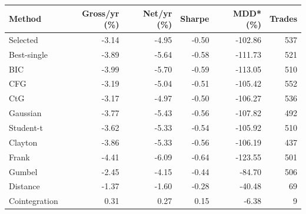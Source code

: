 \begin{tabular}{@{}lrrrrr@{}}
\toprule
Method & Gross/yr (\%) & Net/yr (\%) & Sharpe & MDD* (\%) & Trades \\
\midrule
Selected & -3.14 & -4.95 & -0.50 & -102.86 & 537 \\
Best-single & -3.89 & -5.64 & -0.58 & -111.73 & 521 \\
BIC & -3.99 & -5.70 & -0.59 & -113.05 & 510 \\
CFG & -3.19 & -5.04 & -0.51 & -105.42 & 552 \\
CtG & -3.17 & -4.97 & -0.50 & -106.27 & 536 \\
Gaussian & -3.77 & -5.43 & -0.56 & -107.82 & 492 \\
Student-t & -3.62 & -5.33 & -0.54 & -105.92 & 510 \\
Clayton & -3.86 & -5.33 & -0.56 & -106.19 & 437 \\
Frank & -4.41 & -6.09 & -0.64 & -123.55 & 501 \\
Gumbel & -2.45 & -4.15 & -0.44 & -84.70 & 506 \\
Distance & -1.37 & -1.60 & -0.28 & -40.48 & 69 \\
Cointegration & 0.31 & 0.27 & 0.15 & -6.38 & 9 \\
\bottomrule
\end{tabular}
